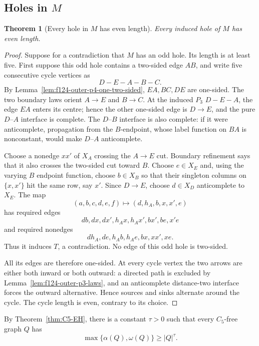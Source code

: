 \documentclass[11pt]{article}
\numberwithin{equation}{section}
\theoremstyle{plain}
\newtheorem{theorem}{Theorem}[section]
\theoremstyle{definition}
\begin{document}
\subsection{Holes in \texorpdfstring{$M$}{M}}

\begin{theorem}[Every hole in \texorpdfstring{$M$}{M} has even length]
\label{thm:f124-outer-no-odd-hole}
Every induced hole of $M$ has even length.
\end{theorem}

\begin{proof}
Suppose for a contradiction that $M$ has an odd hole.  Its length is at
least five.  First suppose this odd hole contains a two-sided edge $AB$, and
write five
consecutive cycle vertices as
\[
                         D-E-A-B-C.
\]
By Lemma~\ref{lem:f124-outer-p4-one-two-sided}, $EA,BC,DE$ are one-sided.
The two boundary laws orient $A\to E$ and $B\to C$.  At the induced
$P_3$ $D-E-A$, the edge $EA$ enters its centre; hence the other
one-sided edge is $D\to E$, and the pure $D$--$A$ interface is complete.
The $D$--$B$ interface is also complete: if it were anticomplete,
propagation from the $B$-endpoint, whose label function on $BA$ is
nonconstant, would make
$D$--$A$ anticomplete.

Choose a nonedge $xx'$ of $X_A$ crossing the $A\to E$ cut.  Boundary
refinement says that it also crosses the two-sided cut toward $B$.  Choose
$e\in X_E$ and, using the varying $B$ endpoint function, choose
$b\in X_B$ so that their singleton columns on $\{x,x'\}$ hit the same
row, say $x'$.  Since $D\to E$, choose $d\in X_D$ anticomplete to
$X_E$.  The map
\[
 (a,b,c,d,e,f)\longmapsto(d,h_A,b,x,x',e)
\]
has required edges
\[
 db,dx,dx',h_Ax,h_Ax',bx',be,x'e
\]
and required nonedges
\[
 dh_A,de,h_Ab,h_Ae,bx,xx',xe.
\]
Thus it induces $T$, a contradiction.  No edge of this odd hole is two-sided.

All its edges are therefore one-sided.  At every cycle vertex the two
arrows are either both inward or both outward: a directed path is
excluded by Lemma~\ref{lem:f124-outer-p3-laws}, and an anticomplete
distance-two interface forces the outward alternative.  Hence sources
and sinks alternate around the cycle.  The cycle length is even, contrary
to its choice.
\end{proof}

By Theorem~\ref{thm:C5-EH}, there is a constant $\tau>0$ such that
every $C_5$-free graph $Q$ has
\begin{equation}
 \max\{\alpha(Q),\omega(Q)\}\geq |Q|^\tau.
 \label{eq:C5-EH-use}
\end{equation}
\end{document}

